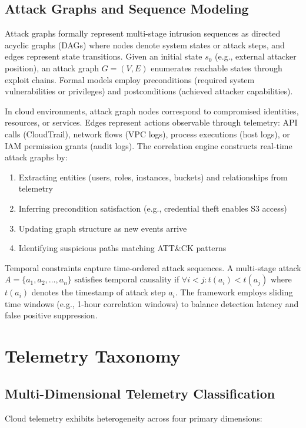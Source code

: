 \subsection{Attack Graphs and Sequence Modeling}
Attack graphs formally represent multi-stage intrusion sequences as directed acyclic graphs (DAGs) where nodes denote system states or attack steps, and edges represent state transitions. Given an initial state $s_0$ (e.g., external attacker position), an attack graph $G = (V, E)$ enumerates reachable states through exploit chains. Formal models employ preconditions (required system vulnerabilities or privileges) and postconditions (achieved attacker capabilities).

In cloud environments, attack graph nodes correspond to compromised identities, resources, or services. Edges represent actions observable through telemetry: API calls (CloudTrail), network flows (VPC logs), process executions (host logs), or IAM permission grants (audit logs). The correlation engine constructs real-time attack graphs by:
\begin{enumerate}
    \item Extracting entities (users, roles, instances, buckets) and relationships from telemetry
    \item Inferring precondition satisfaction (e.g., credential theft enables S3 access)
    \item Updating graph structure as new events arrive
    \item Identifying suspicious paths matching ATT\&CK patterns
\end{enumerate}

Temporal constraints capture time-ordered attack sequences. A multi-stage attack $A = \{a_1, a_2, \ldots, a_n\}$ satisfies temporal causality if $\forall i < j: t(a_i) < t(a_j)$ where $t(a_i)$ denotes the timestamp of attack step $a_i$. The framework employs sliding time windows (e.g., 1-hour correlation windows) to balance detection latency and false positive suppression.

\section{Telemetry Taxonomy}\label{sec:theory-telemetry}
\subsection{Multi-Dimensional Telemetry Classification}
Cloud telemetry exhibits heterogeneity across four primary dimensions:

